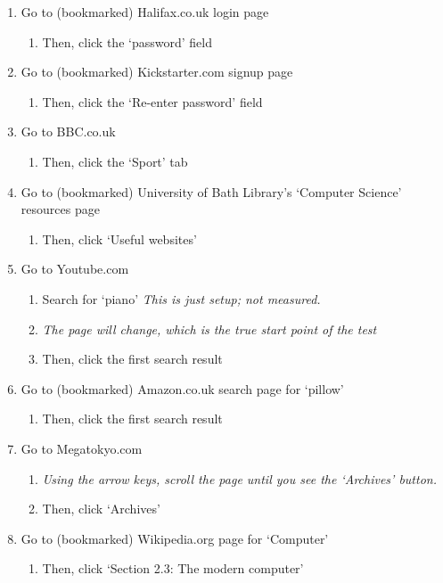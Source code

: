 \documentclass[a4paper, 12pt]{report}
\begin{document}
\begin{enumerate}
\item Go to (bookmarked) Halifax.co.uk login page
	\begin{enumerate}
        \item Then, click the `password' field
    \end{enumerate}
	
\item Go to (bookmarked) Kickstarter.com signup page
	\begin{enumerate}
		\item Then, click the `Re-enter password' field
	\end{enumerate}
	
\item Go to BBC.co.uk
	\begin{enumerate}
		\item Then, click the `Sport' tab
	\end{enumerate}

\item Go to (bookmarked) University of Bath Library's `Computer Science' resources page
	\begin{enumerate}
		\item Then, click `Useful websites'
	\end{enumerate}

\item Go to Youtube.com
	\begin{enumerate}
		\item Search for `piano' \textit{This is just setup; not measured.}
		\item \textit{The page will change, which is the true start point of the test}
		\item Then, click the first search result
	\end{enumerate}

\item Go to (bookmarked) Amazon.co.uk search page for `pillow'
	\begin{enumerate}
		\item Then, click the first search result
	\end{enumerate}

\item Go to Megatokyo.com
	\begin{enumerate}
		\item \textit{Using the arrow keys, scroll the page until you see the `Archives' button.}
		\item Then, click `Archives'
	\end{enumerate}

\item Go to (bookmarked) Wikipedia.org page for `Computer'
	\begin{enumerate}
		\item Then, click `Section 2.3: The modern computer'
	\end{enumerate}
\end{enumerate}
\end{document}
